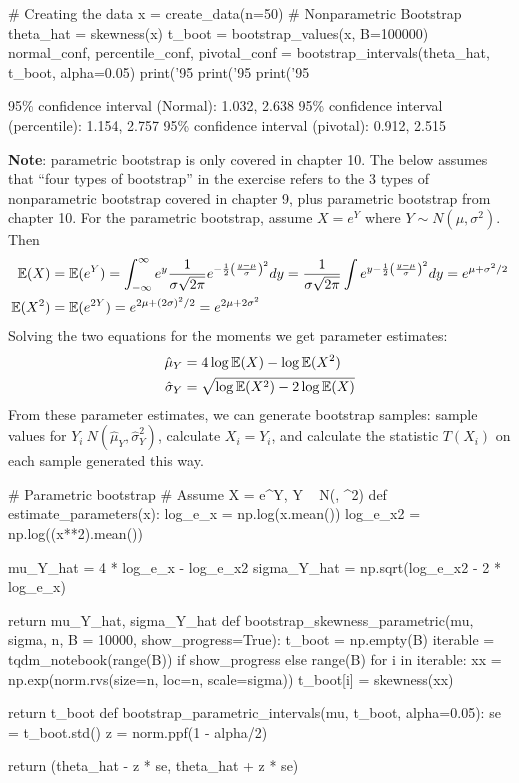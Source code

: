 \begin{python}
# Creating the data
x = create_data(n=50)
# Nonparametric Bootstrap
theta_hat = skewness(x)
t_boot = bootstrap_values(x, B=100000)
normal_conf, percentile_conf, pivotal_conf = bootstrap_intervals(theta_hat, t_boot, alpha=0.05)
print('95%
print('95%
print('95%
\end{python}
\begin{console}
95\% confidence interval (Normal):        1.032, 2.638
95\% confidence interval (percentile):    1.154, 2.757
95\% confidence interval (pivotal):       0.912, 2.515
\end{console}
\textbf{Note}: parametric bootstrap is only covered in chapter 10. The
below assumes that ``four types of bootstrap'' in the exercise refers to
the 3 types of nonparametric bootstrap covered in chapter 9, plus
parametric bootstrap from chapter 10.
For the parametric bootstrap, assume \(X = e^Y\) where
\(Y \sim N(\mu, \sigma^{2})\). Then
\begin{align*}
\EXP(X) & = \EXP(e^Y) = \int_{-\infty}^{\infty} e^y \frac{1}{\sigma \sqrt{2 \pi}} e^{-\frac{1}{2} \left(\frac{y - \mu}{\sigma} \right)^{2}} dy = \frac{1}{\sigma \sqrt{2 \pi}} \int e^{y - \frac{1}{2}\left(\frac{y - \mu}{\sigma}\right)^{2}} dy = e^{\mu + \sigma^{2}/2} \\
\EXP(X^{2}) &= \EXP(e^{2Y}) = e^{2\mu + (2\sigma)^{2}/2} = e^{2\mu + 2\sigma^{2}}
\end{align*}
Solving the two equations for the moments we get parameter estimates:
\begin{align*}
\hat{\mu}_Y & = 4 \log \operatorname{\mathbb{E}}(X) - \log \operatorname{\mathbb{E}}(X^{2}) \\
\hat{\sigma}_Y & = \sqrt{\log \operatorname{\mathbb{E}}(X^{2}) - 2 \log \operatorname{\mathbb{E}}(X)}
\end{align*}
From these parameter estimates, we can generate bootstrap samples:
sample values for \(Y_{i} ~ N(\hat{\mu}_Y, \hat{\sigma}_Y^{2})\), calculate
\(X_{i} = Y_{i}\), and calculate the statistic \(T(X_{i})\) on each sample
generated this way.

\begin{python}
# Parametric bootstrap
# Assume X = e^Y, Y ~ N(\mu, \sigma^{2})
def estimate_parameters(x):
    log_e_x = np.log(x.mean())
    log_e_x2 = np.log((x**2).mean())
    
    mu_Y_hat = 4 * log_e_x - log_e_x2
    sigma_Y_hat = np.sqrt(log_e_x2 - 2 * log_e_x)
    
    return mu_Y_hat, sigma_Y_hat
def bootstrap_skewness_parametric(mu, sigma, n, B = 10000, show_progress=True):
    t_boot = np.empty(B)
    iterable = tqdm_notebook(range(B)) if show_progress else range(B)
    for i in iterable:
        xx = np.exp(norm.rvs(size=n, loc=n, scale=sigma))
        t_boot[i] = skewness(xx)
        
    return t_boot
def bootstrap_parametric_intervals(mu, t_boot, alpha=0.05):
    se = t_boot.std()
    z = norm.ppf(1 - alpha/2)
    
    return (theta_hat - z * se, theta_hat + z * se)
\end{python}


